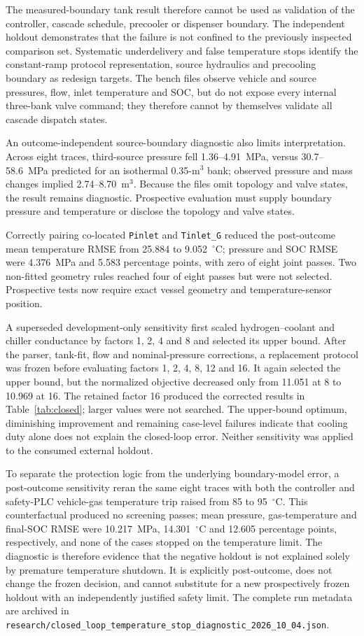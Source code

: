 \documentclass[12pt,a4paper]{article}
\begin{document}
The measured-boundary tank result therefore cannot be used as validation of the
controller, cascade schedule, precooler or dispenser boundary. The independent
holdout demonstrates that the failure is not confined to the previously inspected
comparison set. Systematic underdelivery and false temperature stops identify the
constant-ramp protocol representation, source hydraulics and precooling boundary
as redesign targets. The bench files observe vehicle and source pressures, flow,
inlet temperature and SOC, but do not expose every internal three-bank valve
command; they therefore cannot by themselves validate all cascade dispatch states.

An outcome-independent source-boundary diagnostic also limits interpretation.
Across eight traces, third-source pressure fell 1.36--4.91~MPa, versus
30.7--58.6~MPa predicted for an isothermal 0.35-m$^3$ bank; observed pressure
and mass changes implied 2.74--8.70~m$^3$. Because the files omit topology and
valve states, the result remains diagnostic. Prospective evaluation must supply
boundary pressure and temperature or disclose the topology and valve states.

Correctly pairing co-located \texttt{Pinlet} and \texttt{Tinlet\_G} reduced the
post-outcome mean temperature RMSE from 25.884 to 9.052~$^{\circ}$C; pressure
and SOC RMSE were 4.376~MPa and 5.583 percentage points, with zero of eight
joint passes. Two non-fitted geometry rules reached four of eight passes but
were not selected. Prospective tests now require exact vessel geometry and
temperature-sensor position.

A superseded development-only sensitivity first scaled hydrogen--coolant and
chiller conductance by factors 1, 2, 4 and 8 and selected its upper bound. After
the parser, tank-fit, flow and nominal-pressure corrections, a replacement
protocol was frozen before evaluating factors 1, 2, 4, 8, 12 and 16. It again
selected the upper bound, but the normalized objective decreased only from 11.051
at 8 to 10.969 at 16. The retained factor 16 produced the corrected results in
Table~\ref{tab:closed}; larger values were not searched. The upper-bound optimum,
diminishing improvement and remaining case-level failures indicate that cooling
duty alone does not explain the closed-loop error. Neither sensitivity was applied
to the consumed external holdout.

To separate the protection logic from the underlying boundary-model error, a
post-outcome sensitivity reran the same eight traces with both the controller
and safety-PLC vehicle-gas temperature trip raised from 85 to 95~$^{\circ}$C.
This counterfactual produced no screening passes; mean pressure, gas-temperature
and final-SOC RMSE were 10.217~MPa, 14.301~$^{\circ}$C and 12.605 percentage
points, respectively, and none of the cases stopped on the temperature limit.
The diagnostic is therefore evidence that the negative holdout is not explained
solely by premature temperature shutdown. It is explicitly post-outcome,
does not change the frozen decision, and cannot substitute for a new
prospectively frozen holdout with an independently justified safety limit.
The complete run metadata are archived in
\texttt{research/closed\_loop\_temperature\_stop\_diagnostic\_2026\_10\_04.json}.
\end{document}
